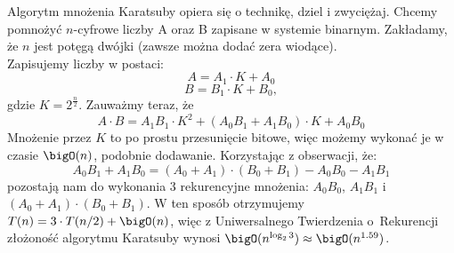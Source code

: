 Algorytm mnożenia Karatsuby opiera się o technikę, dziel i zwyciężaj.
Chcemy pomnożyć \(n\)-cyfrowe liczby A oraz B zapisane w systemie binarnym. Zakładamy, że $n$ jest potęgą dwójki (zawsze można dodać zera wiodące). \\
Zapisujemy liczby w postaci:
\[
    A = A_1 \cdot K + A_0
\]
\[
    B = B_1 \cdot K + B_0,
\]
gdzie \( K = 2^{\frac{n}{2}} \). Zauważmy teraz, że
\[
    A \cdot B = A_1 B_1 \cdot K^2 + (A_0 B_1 + A_1 B_0) \cdot K + A_0 B_0
\]
Mnożenie przez \( K \) to po prostu przesunięcie bitowe, więc możemy wykonać je w czasie \( \bigO(n) \), podobnie dodawanie. Korzystając z obserwacji, że:
\[
    A_0 B_1 + A_1 B_0 = (A_0 + A_1) \cdot (B_0 + B_1) - A_0 B_0 - A_1 B_1
\]
pozostają nam do wykonania 3 rekurencyjne mnożenia: \( A_0 B_0 \), \( A_1 B_1 \) i \( (A_0 + A_1) \cdot (B_0 + B_1) \). W ten sposób otrzymujemy \( T(n) = 3 \cdot T(n / 2) + \bigO(n) \), więc z Uniwersalnego Twierdzenia o~Rekurencji złożoność algorytmu Karatsuby wynosi \( \bigO(n^{\log_2 3}) \approx \bigO(n^{1.59}) \).
